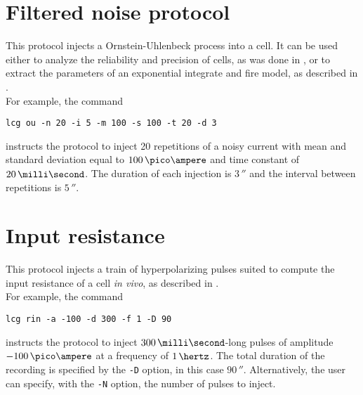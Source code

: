 \section{Filtered noise protocol}
This protocol injects a Ornstein-Uhlenbeck process into a cell. It can
be used either to analyze the reliability and precision of cells, as
was done in \cite{Mainen:1995}, or to extract the parameters of an
exponential integrate and fire model, as described in
\cite{Badel:2008}.\\
For example, the command
\begin{lstlisting}
lcg ou -n 20 -i 5 -m 100 -s 100 -t 20 -d 3
\end{lstlisting}
instructs the protocol to inject 20 repetitions of a noisy current
with mean and standard deviation equal to $100\,\pico\ampere$ and time
constant of $20\,\milli\second$. The duration of each injection is
$3\,\second$ and the interval between repetitions is $5\,\second$.

\section{Input resistance}
This protocol injects a train of hyperpolarizing pulses suited to
compute the input resistance of a cell \emph{in vivo}, as described in
\cite{Crochet:2006}.\\
For example, the command
\begin{lstlisting}
lcg rin -a -100 -d 300 -f 1 -D 90
\end{lstlisting}
instructs the protocol to inject $300\,\milli\second$-long pulses of
amplitude $-100\,\pico\ampere$ at a frequency of $1\,\hertz$. The
total duration of the recording is specified by the \verb+-D+
option, in this case $90\,\second$. Alternatively, the user can
specify, with the \verb+-N+ option, the number of pulses to
inject.


